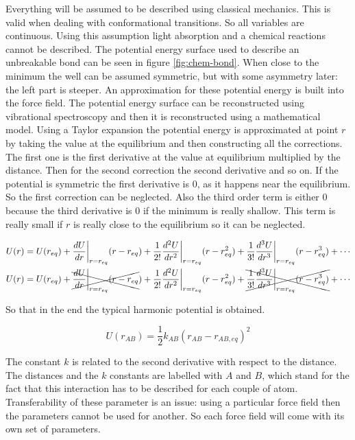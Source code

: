 	Everything will be assumed to be described using classical mechanics.
	This is valid when dealing with conformational transitions.
	So all variables are continuous.
	Using this assumption light absorption and a chemical reactions cannot be described.
	The potential energy surface used to describe an unbreakable bond can be seen in figure \ref{fig:chem-bond}.
	When close to the minimum the well can be assumed symmetric, but with some asymmetry later: the left part is steeper.
	An approximation for these potential energy is built into the force field.
	The potential energy surface can be reconstructed using vibrational spectroscopy and then it is reconstructed using a mathematical model.
	Using a Taylor expansion the potential energy is approximated at point $r$ by taking the value at the equilibrium and then constructing all the corrections.
	The first one is the first derivative at the value at equilibrium multiplied by the distance.
	Then for the second correction the second derivative and so on.
	If the potential is symmetric the first derivative is $0$, as it happens near the equilibrium.
	So the first correction can be neglected.
	Also the third order term is either $0$ because the third derivative is $0$ if the minimum is really shallow.
	This term is really small if $r$ is really close to the equilibrium so it can be neglected.

	\begin{align*}
		U(r)&=U(r_{eq}) + \frac{dU}{dr}\biggr\vert_{r=r_{eq}}(r-r_{eq})+\frac{1}{2!}\frac{d^2U}{dr^2}\biggr\vert_{r=r_{eq}}(r-r_{eq}^2)+\frac{1}{3!}\frac{d^3U}{dr^3}\biggr\vert_{r=r_{eq}}(r-r_{eq}^3)+\cdots\\
		U(r)&=U(r_{eq}) + \xcancel{\frac{dU}{dr}\biggr\vert_{r=r_{eq}}(r-r_{eq}})+\frac{1}{2!}\frac{d^2U}{dr^2}\biggr\vert_{r=r_{eq}}(r-r_{eq}^2)+\xcancel{\frac{1}{3!}\frac{d^3U}{dr^3}\biggr\vert_{r=r_{eq}}(r-r_{eq}^3)}+\cdots\\
	\end{align*}

	So that in the end the typical harmonic potential is obtained.

	$$U(r_{AB}) = \frac{1}{2}k_{AB}(r_{AB}-r_{AB,eq})^2$$

	The constant $k$ is related to the second derivative with respect to the distance.
	The distances and the $k$ constants are labelled with $A$ and $B$, which stand for the fact that this interaction has to be described for each couple of atom.
	Transferability of these parameter is an issue: using a particular force field then the parameters cannot be used for another.
	So each force field will come with its own set of parameters.

